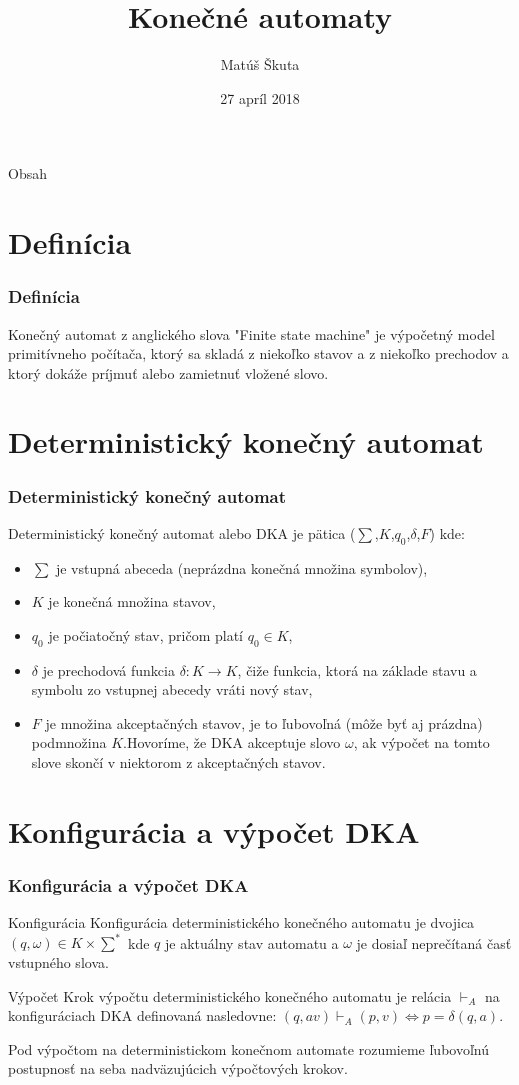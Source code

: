 \documentclass[slovak]{beamer}
\title{Konečné automaty}
\author{Matúš Škuta}
\institute[Vysoké učení technické]
{
  Vysoké učení technické v Brne
}
\date{27 apríl 2018}
\begin{document}
\begin{frame}
  \titlepage
\end{frame}

\begin{frame}{Obsah}
  \tableofcontents
\end{frame}

\section{Definícia}
\frame
{
    \frametitle{Definícia}
    \bigskip
    Konečný automat z anglického slova "Finite state machine" je výpočetný model primitívneho počítača, ktorý sa skladá z niekoľko stavov a z niekoľko prechodov a ktorý dokáže príjmuť alebo zamietnuť vložené slovo.
    \begin{center}
    \end{center}
}


\section{Deterministický konečný automat}
\frame
{
    \frametitle{Deterministický konečný automat}
    Deterministický konečný automat alebo DKA je pätica ($\sum$,$K$,$q_0$,$\delta$,$F$) kde:
    \begin{itemize}
        \item $\sum$ je vstupná abeceda (neprázdna konečná množina symbolov),
        \item $K$ je konečná množina stavov,
        \item $q_0$ je počiatočný stav, pričom platí $q_0 \in K$,
        \item $\delta$ je prechodová funkcia $\delta : K \rightarrow K$, čiže funkcia, ktorá na základe stavu a symbolu zo vstupnej abecedy vráti nový stav,
        \item $F$  je množina akceptačných stavov, je to ľubovoľná (môže byť aj prázdna) podmnožina  $K$.Hovoríme, že DKA akceptuje slovo $\omega$, ak výpočet na tomto slove skončí v niektorom z akceptačných stavov.
    \end{itemize}
}

\section{Konfigurácia a výpočet DKA}
\frame
{
    \frametitle{Konfigurácia a výpočet DKA}
    \begin{block}{Konfigurácia}
        Konfigurácia deterministického konečného automatu je dvojica $(q,\omega) \in K \times \sum^*$ kde $q$ je aktuálny stav automatu a $\omega$ je dosiaľ neprečítaná časť vstupného slova.
    \end{block}
        \begin{block}{Výpočet}
    Krok výpočtu deterministického konečného automatu je relácia $\vdash_A$ na konfiguráciach DKA definovaná nasledovne: $(q,av) \vdash_A(p,v) \Leftrightarrow p = \delta(q,a)$.
    
    Pod výpočtom na deterministickom konečnom automate rozumieme ľubovoľnú postupnosť na seba nadväzujúcich výpočtových krokov.
    \end{block}
}
\end{document}
